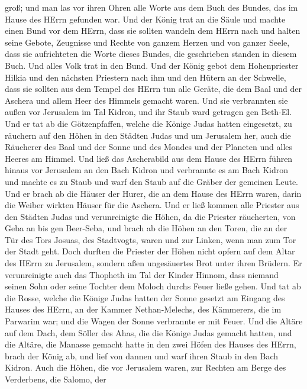 groß; und man las vor ihren Ohren alle Worte aus dem Buch des Bundes,
das im Hause des HErrn gefunden war.  Und der König trat an
die Säule und machte einen Bund vor dem HErrn, dass sie sollten wandeln
dem HErrn nach und halten seine Gebote, Zeugnisse und Rechte von ganzem
Herzen und von ganzer Seele, dass sie aufrichteten die Worte dieses
Bundes, die geschrieben standen in diesem Buch. Und alles Volk trat in
den Bund.  Und der König gebot dem Hohenpriester Hilkia und
den nächsten Priestern nach ihm und den Hütern an der Schwelle, dass sie
sollten aus dem Tempel des HErrn tun alle Geräte, die dem Baal und der
Aschera und allem Heer des Himmels gemacht waren. Und sie verbrannten
sie außen vor Jerusalem im Tal Kidron, und ihr Staub ward getragen gen
Beth-El.  Und er tat ab die Götzenpfaffen, welche die Könige
Judas hatten eingesetzt, zu räuchern auf den Höhen in den Städten Judas
und um Jerusalem her, auch die Räucherer des Baal und der Sonne und des
Mondes und der Planeten und alles Heeres am Himmel.  Und
ließ das Ascherabild aus dem Hause des HErrn führen hinaus vor Jerusalem
an den Bach Kidron und verbrannte es am Bach Kidron und machte es zu
Staub und warf den Staub auf die Gräber der gemeinen Leute. 
Und er brach ab die Häuser der Hurer, die an dem Hause des HErrn waren,
darin die Weiber wirkten Häuser für die Aschera.  Und er
ließ kommen alle Priester aus den Städten Judas und verunreinigte die
Höhen, da die Priester räucherten, von Geba an bis gen Beer-Seba, und
brach ab die Höhen an den Toren, die an der Tür des Tors Josuas, des
Stadtvogts, waren und zur Linken, wenn man zum Tor der Stadt geht.
 Doch durften die Priester der Höhen nicht opfern auf dem
Altar des HErrn zu Jerusalem, sondern aßen ungesäuertes Brot unter ihren
Brüdern.  Er verunreinigte auch das Thopheth im Tal der
Kinder Hinnom, dass niemand seinen Sohn oder seine Tochter dem Moloch
durchs Feuer ließe gehen.  Und tat ab die Rosse, welche die
Könige Judas hatten der Sonne gesetzt am Eingang des Hauses des HErrn,
an der Kammer Nethan-Melechs, des Kämmerers, die im Parwarim war; und
die Wagen der Sonne verbrannte er mit Feuer.  Und die
Altäre auf dem Dach, dem Söller des Ahas, die die Könige Judas gemacht
hatten, und die Altäre, die Manasse gemacht hatte in den zwei Höfen des
Hauses des HErrn, brach der König ab, und lief von dannen und warf ihren
Staub in den Bach Kidron.  Auch die Höhen, die vor
Jerusalem waren, zur Rechten am Berge des Verderbens, die Salomo, der
